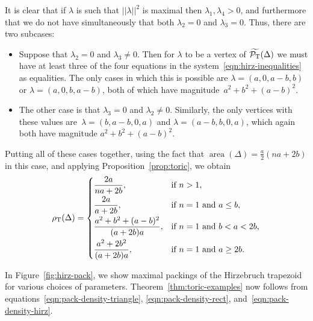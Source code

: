 \documentclass[10pt,a4paper]{amsart}
\numberwithin{equation}{section}
\newcommand{\De}{\Delta}
\newcommand{\area}{\operatorname{area}}
\newcommand{\PT}{\mathcal{P}_{\rm T}}
\newcommand{\PTtilde}{\widetilde{\PT}}
\theoremstyle{definition}
\theoremstyle{plain}
\theoremstyle{plain}
\begin{document}
It is clear that if $\lambda$ is such that $||\lambda||^2$ is maximal then $\lambda_1, \lambda_4>0$, and furthermore that we do not have simultaneously that both $\lambda_2=0$ and $\lambda_3=0$.
Thus, there are two subcases:
\begin{itemize}\itemsep=0pt
 \item Suppose that $\lambda_2=0$ and $\lambda_3\neq 0$.
Then for $\lambda$ to be a vertex of $\PTtilde(\De)$ we must have at least three of the four equations in the system~\eqref{eqn:hirz-inequalities} as equalities.
The only cases in which this is possible are $\lambda = (a,0,a-b,b)$ or $\lambda = (a,0,b,a-b)$, both of which have magnitude~$a^2+b^2+(a-b)^2$.

\item The other case is that $\lambda_3=0$ and $\lambda_2\neq 0$. Similarly, the only vertices with these values are~$\lambda = (b, a-b, 0, a)$ and $\lambda = (a-b, b, 0, a)$, which again both have magnitude $a^2+b^2+(a-b)^2$.
\end{itemize}

Putting all of these cases together, using the fact that $\area(\De) = \frac{a}{2}(na+2b)$ in this case, and applying Proposition~\ref{prop:toric}, we obtain
\begin{equation}\label{eqn:pack-density-hirz}
 \rho_{{\rm T}}(\De) = \begin{cases}
 \dfrac{2a}{na+2b}, & \textrm{if }n>1,\vspace{1mm}\\
 \dfrac{2a}{a+2b}, & \textrm{if }n=1 \textrm{ and }a\leq b,\vspace{1mm}\\
 \dfrac{a^2+b^2+ (a-b)^2}{(a+2b)a}, & \textrm{if }n=1 \textrm{ and } b<a<2b,\vspace{1mm}\\
 \dfrac{a^2+2b^2}{(a+2b)a}, & \textrm{if }n=1 \textrm{ and } a \geq 2b. \end{cases}
\end{equation}

In Figure~\ref{fig:hirz-pack}, we show maximal packings of the Hirzebruch trapezoid for various choices of parameters.
Theorem~\ref{thm:toric-examples} now follows from equations~\eqref{eqn:pack-density-triangle}, \eqref{eqn:pack-density-rect}, and~\eqref{eqn:pack-density-hirz}.
\end{document}
